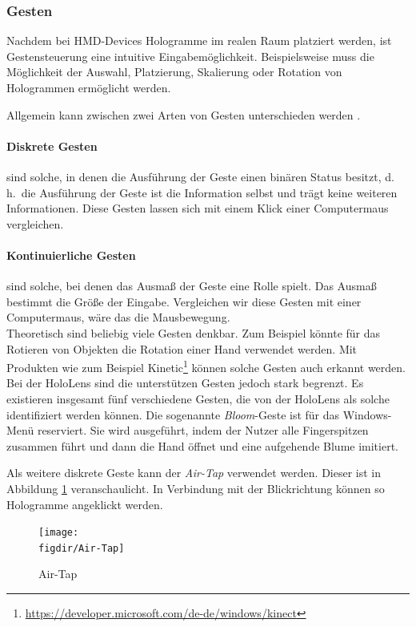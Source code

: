 \subsubsection*{Gesten}
Nachdem bei HMD-Devices Hologramme im realen Raum platziert werden, ist Gestensteuerung eine intuitive Eingabemöglichkeit. Beispielsweise muss die Möglichkeit der Auswahl, Platzierung, Skalierung oder Rotation von Hologrammen ermöglicht werden.

Allgemein kann zwischen zwei Arten von Gesten unterschieden werden \cite{windows2017gesture}.

\paragraph{Diskrete Gesten} sind solche, in denen die Ausführung der Geste einen binären Status besitzt, d.\,h.\ die Ausführung der Geste ist die Information selbst und trägt keine weiteren Informationen. Diese Gesten lassen sich mit einem Klick einer Computermaus vergleichen.

\paragraph{Kontinuierliche Gesten} sind solche, bei denen das Ausmaß der Geste eine Rolle spielt. Das Ausmaß bestimmt die Größe der Eingabe. Vergleichen wir diese Gesten mit einer Computermaus, wäre das die Mausbewegung.\\

Theoretisch sind beliebig viele Gesten denkbar. Zum Beispiel könnte für das Rotieren von Objekten die Rotation einer Hand verwendet werden. Mit Produkten wie zum Beispiel Kinetic\footnote{\url{https://developer.microsoft.com/de-de/windows/kinect}} können solche Gesten auch erkannt werden. Bei der HoloLens sind die unterstützen Gesten jedoch stark begrenzt. Es existieren insgesamt fünf verschiedene Gesten, die von der HoloLens als solche identifiziert werden können. Die sogenannte \textit{Bloom}-Geste ist für das Windows-Menü reserviert. Sie wird ausgeführt, indem der Nutzer alle Fingerspitzen zusammen führt und dann die Hand öffnet und eine aufgehende Blume imitiert.

Als weitere diskrete Geste kann der \textit{Air-Tap} verwendet werden. Dieser ist in Abbildung \ref{fig:Air-Tap} veranschaulicht. In Verbindung mit der Blickrichtung können so Hologramme angeklickt werden.

\begin{figure}[htb]
  \texttt{[image: \\figdir/Air-Tap]}
  \caption{Air-Tap \cite{windows2017gesture}}
  \label{fig:Air-Tap}
\end{figure}

